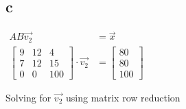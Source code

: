 \documentclass[12pt]{article}
\begin{document}
\subsection*{c}
\begin{center}
    $
        \begin{alignedat}{2}
            AB \vec{v_2}    & = \vec{x} \\
            \begin{bmatrix}
                9 & 12 & 4   \\
                7 & 12 & 15  \\
                0 & 0  & 100
            \end{bmatrix}
            \cdot \vec{v_2} & =
            \begin{bmatrix}
                80 \\
                80 \\
                100
            \end{bmatrix}
        \end{alignedat}
    $
\end{center}
Solving for $\vec{v_2}$ using matrix row reduction
\end{document}
